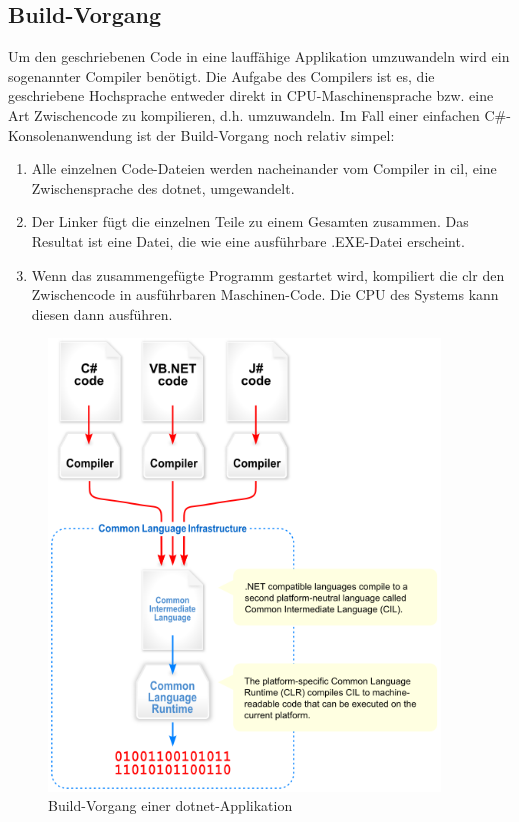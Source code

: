 \subsection{Build-Vorgang}
Um den geschriebenen Code in eine lauffähige Applikation umzuwandeln wird ein sogenannter Compiler benötigt.
Die Aufgabe des Compilers ist es, die geschriebene Hochsprache entweder direkt in CPU-Maschinensprache bzw. eine Art Zwischencode zu kompilieren, d.h. umzuwandeln. Im Fall einer einfachen C\#-Konsolenanwendung ist der Build-Vorgang noch relativ simpel:
\begin{enumerate}
    \item Alle einzelnen Code-Dateien werden nacheinander vom Compiler in \ac{cil}, eine Zwischensprache des \ac{dotnet}, umgewandelt.
    \item Der Linker fügt die einzelnen Teile zu einem Gesamten zusammen.
    Das Resultat ist eine Datei, die wie eine ausführbare .EXE-Datei erscheint.
    \item Wenn das zusammengefügte Programm gestartet wird, kompiliert die \ac{clr} den Zwischencode in ausführbaren Maschinen-Code.
    Die CPU des Systems kann diesen dann ausführen.
\end{enumerate}
\begin{figure}[H]
    \centering\includegraphics[height=12cm]{images/auswahl_rahmenwerk/dotnet-compilation.png}
    \caption{Build-Vorgang einer \ac{dotnet}-Applikation\cite{wiki-cli}}
\end{figure}

